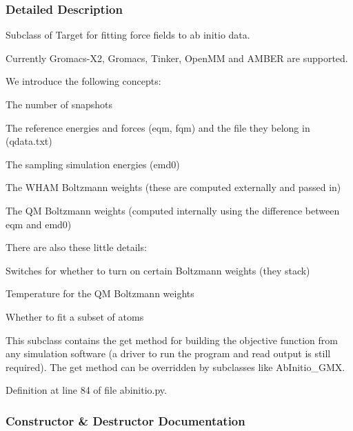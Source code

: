 \subsubsection{Detailed Description}
Subclass of Target for fitting force fields to ab initio data. 

Currently Gromacs-\/\+X2, Gromacs, Tinker, Open\+MM and A\+M\+B\+ER are supported.

We introduce the following concepts\+:
\begin{DoxyItemize}
\item The number of snapshots
\item The reference energies and forces (eqm, fqm) and the file they belong in (qdata.\+txt)
\item The sampling simulation energies (emd0)
\item The W\+H\+AM Boltzmann weights (these are computed externally and passed in)
\item The QM Boltzmann weights (computed internally using the difference between eqm and emd0)
\end{DoxyItemize}

There are also these little details\+:
\begin{DoxyItemize}
\item Switches for whether to turn on certain Boltzmann weights (they stack)
\item Temperature for the QM Boltzmann weights
\item Whether to fit a subset of atoms
\end{DoxyItemize}

This subclass contains the \textquotesingle{}get\textquotesingle{} method for building the objective function from any simulation software (a driver to run the program and read output is still required). The \textquotesingle{}get\textquotesingle{} method can be overridden by subclasses like Ab\+Initio\+\_\+\+G\+MX. 

Definition at line 84 of file abinitio.\+py.



\subsubsection{Constructor \& Destructor Documentation}
\mbox{\label{classsrc_1_1abinitio_1_1AbInitio_a05142b8321814feceac1a39ab338615e}} 
